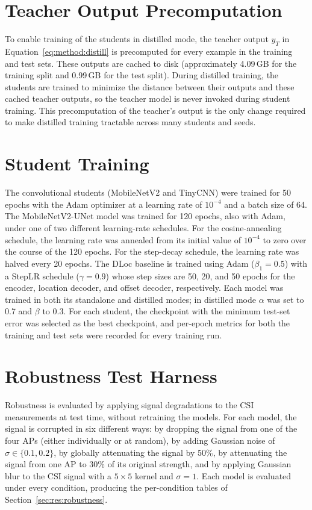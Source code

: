 \section{Teacher Output Precomputation}
\label{sec:impl:teacher}

To enable training of the students in distilled mode, the teacher output $y_T$ in
Equation~\eqref{eq:method:distill} is precomputed for every example in the training and test sets. These
outputs are cached to disk (approximately 4.09\,GB for the training split and 0.99\,GB for the test
split). During distilled training, the students are trained to minimize the distance between their
outputs and these cached teacher outputs, so the teacher model is never invoked during student training.
This precomputation of the teacher's output is the only change required to make distilled training
tractable across many students and seeds.

\section{Student Training}
\label{sec:impl:training}

The convolutional students (MobileNetV2 and TinyCNN) were trained for 50 epochs with the Adam optimizer
at a learning rate of $10^{-4}$ and a batch size of 64. The MobileNetV2-UNet model was trained for 120
epochs, also with Adam, under one of two different learning-rate schedules. For the cosine-annealing
schedule, the learning rate was annealed from its initial value of $10^{-4}$ to zero over the course of
the 120 epochs. For the step-decay schedule, the learning rate was halved every 20 epochs. The DLoc
baseline is trained using Adam ($\beta_1 = 0.5$) with a StepLR schedule ($\gamma = 0.9$) whose step sizes are 50, 20, and 50
epochs for the encoder, location decoder, and offset decoder, respectively. Each model was trained in
both its standalone and distilled modes; in distilled mode $\alpha$ was set to 0.7 and $\beta$ to 0.3.
For each student, the checkpoint with the minimum test-set error was selected as the best checkpoint, and
per-epoch metrics for both the training and test sets were recorded for every training run.

\section{Robustness Test Harness}
\label{sec:impl:robustness}

Robustness is evaluated by applying signal degradations to the CSI measurements at test time, without
retraining the models. For each model, the signal is corrupted in six different ways: by dropping the
signal from one of the four APs (either individually or at random), by adding Gaussian noise of
$\sigma \in \{0.1, 0.2\}$, by globally attenuating the signal by 50\%, by attenuating the signal from one
AP to 30\% of its original strength, and by applying Gaussian blur to the CSI signal with a $5 \times 5$
kernel and $\sigma = 1$. Each model is evaluated under every condition, producing the per-condition
tables of Section~\ref{sec:res:robustness}.

